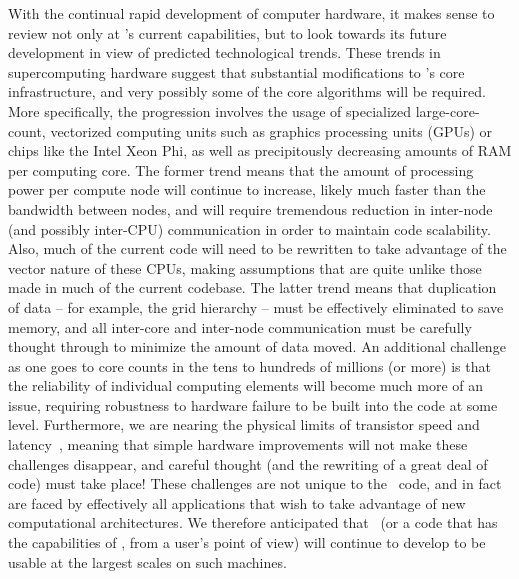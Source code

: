 With the continual rapid development of computer hardware, it makes sense to review
not only at \enzo's current capabilities, but to look towards its future development 
in view of predicted technological trends. These trends in supercomputing hardware suggest that  
substantial modifications to \enzo's core infrastructure, and very possibly some of 
the core algorithms will be required. More
specifically, the progression involves the usage of specialized
large-core-count, vectorized computing units such as graphics
processing units (GPUs) or chips like the Intel Xeon Phi, as well as
precipitously decreasing amounts of RAM per computing core.  The
former trend means that the amount of processing power per compute
node will continue to increase, likely much faster than the
bandwidth between nodes, and will require tremendous reduction in
inter-node (and possibly inter-CPU) communication in order to maintain
code scalability.  Also, much of the current code will need to be
rewritten to take advantage of the vector nature of these CPUs, making
assumptions that are quite unlike those made in much of the current
codebase.  The latter trend means that duplication of data -- for
example, the grid hierarchy -- must be effectively eliminated to save
memory, and all inter-core and inter-node communication must be
carefully thought through to minimize the amount of data moved.  An
additional challenge as one goes to core counts in the tens to
hundreds of millions (or more) is that the reliability of individual
computing elements will become much more of an issue, requiring
robustness to hardware failure to be built into the code at some
level.  Furthermore, we are nearing the physical limits of transistor
speed and latency~\citep{feynman1999feynman}, meaning that simple
hardware improvements will not make these challenges disappear, and
careful thought (and the rewriting of a great deal of code) must take
place!  These challenges are not unique to the \enzo\ code, and in
fact are faced by effectively all applications that wish to take
advantage of new computational architectures. We therefore anticipated that 
\enzo\ (or a code that has the capabilities of \enzo, from a user's
point of view) will continue to develop to be usable at the largest scales on
such machines.


